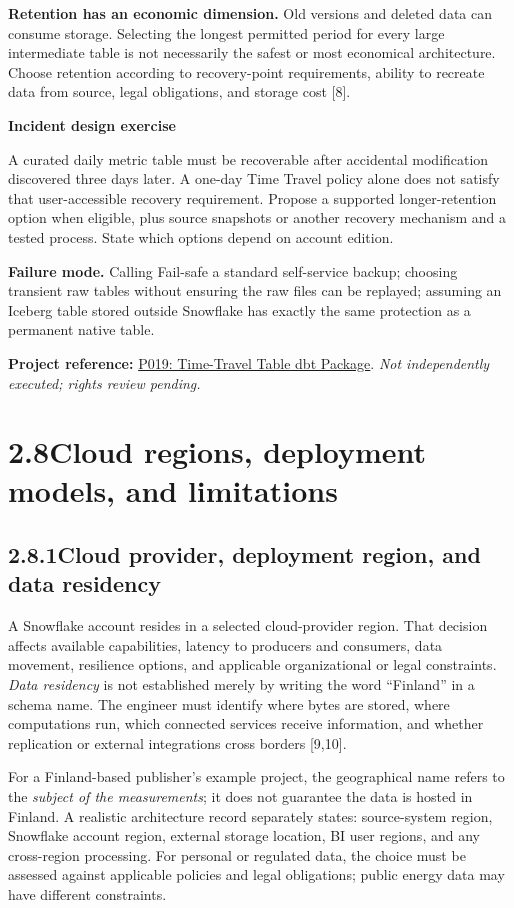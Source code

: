 \documentclass[11pt,twoside]{article}
\newcommand{\topic}[2]{\subsection*{#1\quad #2}}
\newcommand{\repo}[2]{\par\begingroup\fontsize{8.0}{9.6}\selectfont\sffamily\color{inkgray}\textbf{Project reference:} \href{#2}{#1}. \textit{Not independently executed; rights review pending.}\par\endgroup}
\begin{document}
\textbf{Retention has an economic dimension.} Old versions and deleted data can consume storage. Selecting the longest permitted period for every large intermediate table is not necessarily the safest or most economical architecture. Choose retention according to recovery-point requirements, ability to recreate data from source, legal obligations, and storage cost [8].

\begin{whitebox}
\textbf{Incident design exercise}\par
A curated daily metric table must be recoverable after accidental modification discovered three days later. A one-day Time Travel policy alone does not satisfy that user-accessible recovery requirement. Propose a supported longer-retention option when eligible, plus source snapshots or another recovery mechanism and a tested process. State which options depend on account edition.
\end{whitebox}

\textbf{Failure mode.} Calling Fail-safe a standard self-service backup; choosing transient raw tables without ensuring the raw files can be replayed; assuming an Iceberg table stored outside Snowflake has exactly the same protection as a permanent native table.
\repo{P019: Time-Travel Table dbt Package}{https://github.com/edx/snowflake_timetravel_table}

\newpage
\section*{2.8\quad Cloud regions, deployment models, and limitations}
\topic{2.8.1}{Cloud provider, deployment region, and data residency}
A Snowflake account resides in a selected cloud-provider region. That decision affects available capabilities, latency to producers and consumers, data movement, resilience options, and applicable organizational or legal constraints. \emph{Data residency} is not established merely by writing the word ``Finland'' in a schema name. The engineer must identify where bytes are stored, where computations run, which connected services receive information, and whether replication or external integrations cross borders [9,10].

For a Finland-based publisher's example project, the geographical name refers to the \emph{subject of the measurements}; it does not guarantee the data is hosted in Finland. A realistic architecture record separately states: source-system region, Snowflake account region, external storage location, BI user regions, and any cross-region processing. For personal or regulated data, the choice must be assessed against applicable policies and legal obligations; public energy data may have different constraints.
\end{document}
